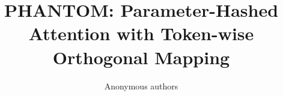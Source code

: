 \title{\textbf{PHANTOM: Parameter-Hashed Attention with Token-wise Orthogonal Mapping}}

\author{Anonymous authors}
